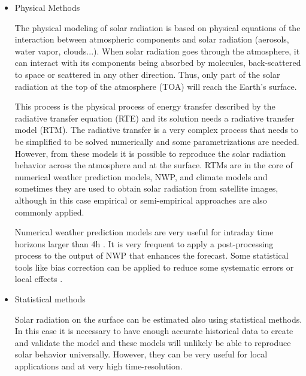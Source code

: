 \begin{itemize}
\item{Physical Methods}

The physical modeling of solar radiation is based on physical equations of the interaction between atmospheric components and solar radiation (aerosols, water vapor, clouds...). When solar radiation goes through the atmosphere, it can interact with its components being absorbed by molecules, back-scattered to space or scattered in any other direction. Thus, only part of the solar radiation at the top of the atmosphere (TOA) will reach the Earth's surface.


This process is the physical process of energy transfer described by the radiative transfer equation (RTE) and its solution needs a radiative transfer model (RTM). The radiative transfer is a very complex process that needs to be simplified to be solved numerically and some parametrizations are needed. However, from these models it is possible to reproduce the solar radiation behavior across the atmosphere and at the surface. RTMs are in the core of numerical weather prediction models, NWP, and climate models and sometimes they are used to obtain solar radiation from satellite images, although in this case empirical or semi-empirical approaches are also commonly applied.


Numerical weather prediction models are very useful for intraday time horizons larger than 4h \cite*{Perez2010}. It is very frequent to apply a post-processing process to the output of NWP that enhances the forecast. Some statistical tools like bias correction can be applied to reduce some systematic errors or local effects \cite*{Diagne2013}.


\item{Statistical methods}

Solar radiation on the surface can be estimated also using statistical methods. In this case it is necessary to have enough accurate historical data to create and validate the model and these models will unlikely be able to reproduce solar behavior universally. However, they can be very useful for local applications and at very high time-resolution.


\end{itemize}
